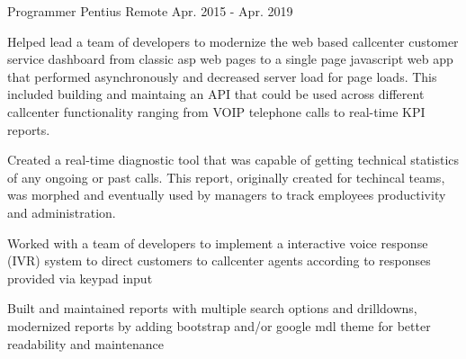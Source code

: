 \begin{cventries}
  \cventry
    {Programmer} %
    {Pentius} %
    {Remote} %
    {Apr. 2015 - Apr. 2019} %
    {
      \begin{cvitems} %
        \item {Helped lead a team of developers to modernize the web based callcenter customer service dashboard from classic asp web pages to a single page javascript web app that performed asynchronously and decreased server load for page loads. This included building and maintaing an API that could be used across different callcenter functionality ranging from VOIP telephone calls to real-time KPI reports.}
        \item {Created a real-time diagnostic tool that was capable of getting technical statistics of any ongoing or past calls. This report, originally created for techincal teams, was morphed and eventually used by managers to track employees productivity and administration.}
        \item {Worked with a team of developers to implement a interactive voice response (IVR) system to direct customers to callcenter agents according to responses provided via keypad input}
        \item {Built and maintained reports with multiple search options and drilldowns, modernized reports by adding bootstrap and/or google mdl theme for better readability and maintenance}
      \end{cvitems}
    }

\end{cventries}

